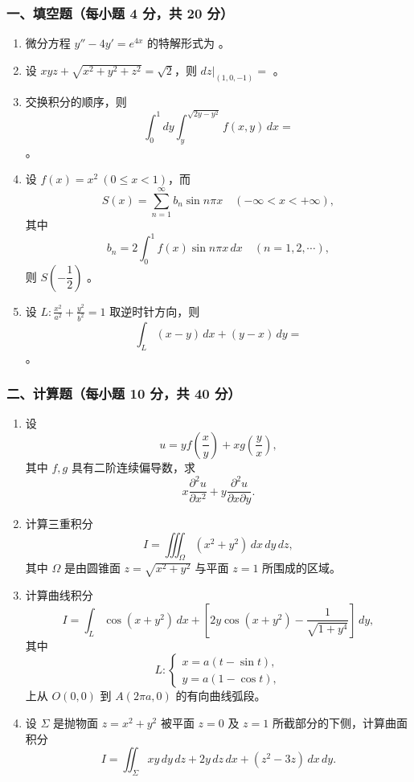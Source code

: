 \subsubsection*{一、填空题（每小题 4 分，共 20 分）}
\begin{enumerate}
  \item 微分方程 \(\displaystyle y''-4y'=e^{4x}\) 的特解形式为 \underline{\hspace{4cm}}。
  \item 设 \(\displaystyle xyz+\sqrt{x^2+y^2+z^2}=\sqrt2\)，则 $\left.dz\right|_{(1,0,-1)}=$ \underline{\hspace{3cm}}。
  \item 交换积分的顺序，则
  \[
  \int_0^1dy\int_y^{\sqrt{2y-y^2}}f(x,y)\,dx=
  \]
  \underline{\hspace{3cm}}。
  \item 设 $f(x)=x^2\ (0\le x<1)$，而
  \[
  S(x)=\sum_{n=1}^{\infty}b_n\sin n\pi x\quad(-\infty<x<+\infty),
  \]
  其中
  \[
  b_n=2\int_0^1 f(x)\sin n\pi x\,dx\quad(n=1,2,\cdots),
  \]
  则 $S\!\left(-\dfrac12\right)$ \underline{\hspace{3cm}}。
  \item 设 \(\displaystyle L:\frac{x^2}{a^2}+\frac{y^2}{b^2}=1\) 取逆时针方向，则
  \[
  \int_L(x-y)\,dx+(y-x)\,dy=
  \]
  \underline{\hspace{3cm}}。
\end{enumerate}

\subsubsection*{二、计算题（每小题 10 分，共 40 分）}
\begin{enumerate}
  \item 设
  \[
  u=yf\!\left(\frac{x}{y}\right)+xg\!\left(\frac{y}{x}\right),
  \]
  其中 $f,g$ 具有二阶连续偏导数，求
  \[
  x\frac{\partial^2u}{\partial x^2}+y\frac{\partial^2u}{\partial x\partial y}.
  \]
  \item 计算三重积分
  \[
  I=\iiint_\Omega (x^2+y^2)\,dx\,dy\,dz,
  \]
  其中 $\Omega$ 是由圆锥面 $z=\sqrt{x^2+y^2}$ 与平面 $z=1$ 所围成的区域。
  \item 计算曲线积分
  \[
  I=\int_L \cos(x+y^2)\,dx+\left[2y\cos(x+y^2)-\frac1{\sqrt{1+y^4}}\right]\,dy,
  \]
  其中
  \[
  L:\begin{cases}
  x=a(t-\sin t),\\
  y=a(1-\cos t),
  \end{cases}
  \]
  上从 $O(0,0)$ 到 $A(2\pi a,0)$ 的有向曲线弧段。
  \item 设 $\Sigma$ 是抛物面 $z=x^2+y^2$ 被平面 $z=0$ 及 $z=1$ 所截部分的下侧，计算曲面积分
  \[
  I=\iint_\Sigma xy\,dy\,dz+2y\,dz\,dx+(z^2-3z)\,dx\,dy.
  \]
\end{enumerate}

